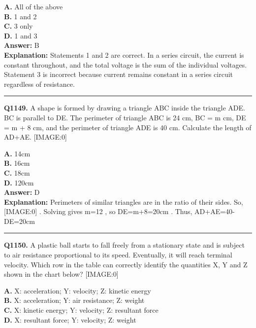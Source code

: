 \documentclass[12pt]{article}
\begin{document}
\textbf{A.} All of the above \\
\textbf{B.} 1 and 2 \\
\textbf{C.} 3 only \\
\textbf{D.} 1 and 3 \\

\textbf{Answer:} B \\
\textbf{Explanation:} Statements 1 and 2 are correct. In a series circuit, the current is constant throughout, and the total voltage is the sum of the individual voltages. Statement 3 is incorrect because current remains constant in a series circuit regardless of resistance.

\hrule
\vspace{1em}


\noindent
\textbf{Q1149.} A shape is formed by drawing a triangle ABC inside the triangle ADE. BC is parallel to DE. The perimeter of triangle ABC is 24 cm, BC = m cm, DE = m + 8 cm, and the perimeter of triangle ADE is 40 cm.
Calculate the length of AD+AE.
[IMAGE:0]



\textbf{A.} 14cm \\
\textbf{B.} 16cm \\
\textbf{C.} 18cm \\
\textbf{D.} 120cm \\

\textbf{Answer:} D \\
\textbf{Explanation:} Perimeters of similar triangles are in the ratio of their sides. So,
[IMAGE:0]
. Solving gives m=12
, so DE=m+8=20cm
.
Thus, AD+AE=40-DE=20cm

\hrule
\vspace{1em}


\noindent
\textbf{Q1150.} A plastic ball starts to fall freely from a stationary state and is subject to air resistance proportional to its speed. Eventually, it will reach terminal velocity. Which row in the table can correctly identify the quantities X, Y and Z shown in the chart below?
[IMAGE:0]



\textbf{A.} X: acceleration; Y: velocity; Z: kinetic energy \\
\textbf{B.} X: acceleration; Y: air resistance; Z: weight \\
\textbf{C.} X: kinetic energy; Y: velocity; Z: resultant force \\
\textbf{D.} X: resultant force; Y: velocity; Z: weight \\
\end{document}
